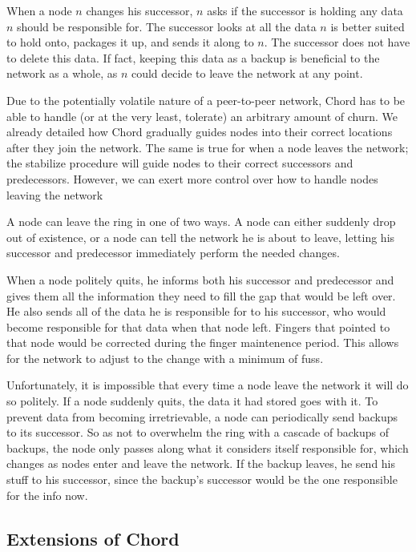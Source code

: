 \documentclass[conference, compsocconf, letterpaper]{IEEEtran}
\begin{document}
When a node $n$ changes his successor, $n$ asks if the successor is holding any data $n$ should be responsible for.  The successor looks at all the data $n$ is better suited to hold onto, packages it up, and sends it along to $n$.  The successor does not have to delete this data. If fact, keeping this data as a backup is beneficial to the network as a whole, as $n$ could decide to leave the network at any point. 

Due to the potentially volatile nature of a peer-to-peer network, Chord has to be able to handle (or at the very least, tolerate) an arbitrary amount of churn.  We already detailed how Chord gradually guides nodes into their correct locations after they join the network.  The same is true for when a node leaves the network; the stabilize procedure will guide nodes to their correct successors and predecessors.  However, we can exert more control over how to handle nodes leaving the network

A node can leave the ring in one of two ways.  A node can either suddenly drop out of existence, or a node can tell the network he is about to leave, letting his successor and predecessor immediately perform the needed changes.

When a node politely quits, he informs both his successor and predecessor and gives them all the information they need to fill the gap that would be left over. He also sends all of the data he is responsible for to his successor, who would become responsible for that data when that node left.  Fingers that pointed to that node would be corrected during the finger maintenence period.  This allows for the network to adjust to the change with a minimum of fuss.

Unfortunately, it is impossible that every time a node leave the network it will do so politely.  If a node suddenly quits, the data it had stored goes with it. To prevent data from becoming irretrievable, a node can periodically send backups to its successor.  So as not to overwhelm the ring with a cascade of backups of backups, the node only passes along what it considers itself responsible for, which changes as nodes enter and leave the network.  If the backup leaves, he send his stuff to his successor, since the backup's successor would be the one responsible for the info now. 


\subsection{Extensions of Chord}
\end{document}
